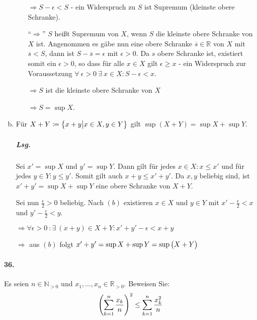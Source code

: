 \documentclass{scrreprt}
\begin{document}
\begin{enumerate}[(a)]
\begin{itemize}
    $\Rightarrow S - \epsilon < S$ - ein Widerspruch zu $S$ ist Supremum
    (kleinste obere Schranke).

  \item[``$\Rightarrow$''] $S$ heißt Supremum von $X$, wenn $S$ die kleinste
    obere Schranke von $X$ ist.
    Angenommen es gäbe nun eine obere Schranke $\overline{s} \in \mathbb{R}$
    von $X$ mit $\overline{s} < S$, dann ist $S - \overline{s} = \epsilon$ mit
    $\epsilon > 0$.
    Da $s$ obere Schranke ist, existiert somit ein $\epsilon > 0$, so dass
    für alle $x \in X$ gilt $\epsilon \geq x$ - ein Widerspruch zur
    Voraussetzung
    $\forall \: \epsilon > 0 \: \exists \: x \in X \colon S - \epsilon < x$.

    $\Rightarrow S$ ist die kleinste obere Schranke von $X$

    $\Rightarrow S = \sup X$.
  \end{itemize}

\newpage
\item Für $X + Y \coloneqq \qty\big{ x + y {\big |} x \in X, y \in Y}$ gilt
  $\sup(X + Y) = \sup X + \sup Y$.

  \subparagraph{Lsg.} Sei $x' = \sup X$ und $y' = \sup Y$.
  Dann gilt für jedes $x \in X \colon x \leq x'$ und für jedes
  $y \in Y \colon y \leq y'$.
  Somit gilt auch $x + y \leq x' + y'$.
  Da $x, y$ beliebig sind, ist $x' + y' = \sup X + \sup Y$ eine obere Schranke
  von $X + Y$.

  Sei nun $\frac{\epsilon}{2} > 0$ beliebig.
  Nach $(b)$ existieren $x \in X$ und $y \in Y$ mit
  $x' - \frac{\epsilon}{2} < x$ und $y' - \frac{\epsilon}{2} < y$.

  $\Rightarrow \forall \epsilon > 0 \: \colon \exists \: (x + y) \in X + Y
  \colon x' + y' - \epsilon < x + y$

  $\Rightarrow$ aus $(b)$ folgt
  $x' + y' = \sup X + \sup Y = \sup \qty\big(X + Y)$
\end{enumerate}

\newpage
\paragraph{36.} Es seien $n \in \mathbb{N}_{> 0}$ und
$x_1, \ldots, x_n \in \mathbb{R}_{> 0}$.
Beweisen Sie:
\[
  \qty(\sum_{k = 1}^n \frac{x_k}{n})^2 \leq \sum_{k = 1}^n \frac{x_k^2}{n}
\]
\end{document}
